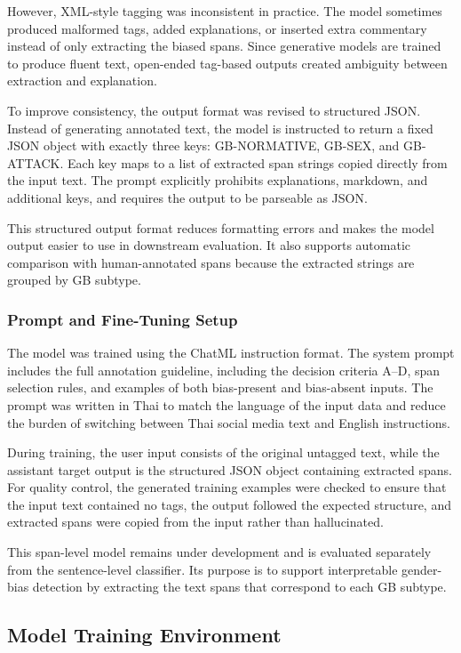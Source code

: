 \documentclass[12pt,oneside,openright,a4paper]{cpe-english-project}
\begin{document}
However, XML-style tagging was inconsistent in practice. The model sometimes produced malformed tags, added explanations, or inserted extra commentary instead of only extracting the biased spans. Since generative models are trained to produce fluent text, open-ended tag-based outputs created ambiguity between extraction and explanation.

To improve consistency, the output format was revised to structured JSON. Instead of generating annotated text, the model is instructed to return a fixed JSON object with exactly three keys: GB-NORMATIVE, GB-SEX, and GB-ATTACK. Each key maps to a list of extracted span strings copied directly from the input text. The prompt explicitly prohibits explanations, markdown, and additional keys, and requires the output to be parseable as JSON.

This structured output format reduces formatting errors and makes the model output easier to use in downstream evaluation. It also supports automatic comparison with human-annotated spans because the extracted strings are grouped by GB subtype.

\subsubsection{Prompt and Fine-Tuning Setup}

The model was trained using the ChatML instruction format. The system prompt includes the full annotation guideline, including the decision criteria A--D, span selection rules, and examples of both bias-present and bias-absent inputs. The prompt was written in Thai to match the language of the input data and reduce the burden of switching between Thai social media text and English instructions.

During training, the user input consists of the original untagged text, while the assistant target output is the structured JSON object containing extracted spans. For quality control, the generated training examples were checked to ensure that the input text contained no tags, the output followed the expected structure, and extracted spans were copied from the input rather than hallucinated.

This span-level model remains under development and is evaluated separately from the sentence-level classifier. Its purpose is to support interpretable gender-bias detection by extracting the text spans that correspond to each GB subtype.

\subsection{Model Training Environment}
\end{document}

